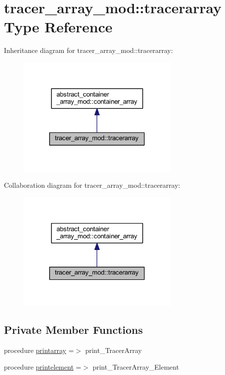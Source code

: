 \hypertarget{structtracer__array__mod_1_1tracerarray}{}\section{tracer\+\_\+array\+\_\+mod\+:\+:tracerarray Type Reference}
\label{structtracer__array__mod_1_1tracerarray}


Inheritance diagram for tracer\+\_\+array\+\_\+mod\+:\+:tracerarray\+:
\nopagebreak
\begin{figure}[H]
\begin{center}
\leavevmode
\includegraphics[width=225pt]{structtracer__array__mod_1_1tracerarray__inherit__graph}
\end{center}
\end{figure}


Collaboration diagram for tracer\+\_\+array\+\_\+mod\+:\+:tracerarray\+:
\nopagebreak
\begin{figure}[H]
\begin{center}
\leavevmode
\includegraphics[width=225pt]{structtracer__array__mod_1_1tracerarray__coll__graph}
\end{center}
\end{figure}
\subsection*{Private Member Functions}
\begin{DoxyCompactItemize}
\item 
procedure \hyperlink{structtracer__array__mod_1_1tracerarray_a135a59d74ec030814a19278694d25d0a}{printarray} =$>$ print\+\_\+\+Tracer\+Array
\item 
procedure \hyperlink{structtracer__array__mod_1_1tracerarray_a253185a06f76355710fcdd52d9a525f6}{printelement} =$>$ print\+\_\+\+Tracer\+Array\+\_\+\+Element
\end{DoxyCompactItemize}


